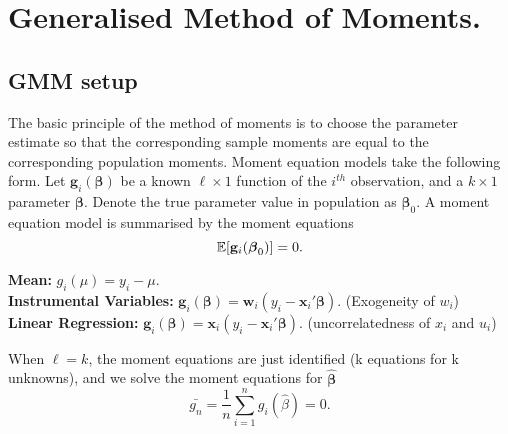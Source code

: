 \documentclass[DIV=14,titlepage=false]{scrreprt}
\begin{document}
\vspace{-10pt}
\setcounter{chapter}{15}
\chapter{Generalised Method of Moments.}
\section{GMM setup}
The basic principle of the method of moments is to choose the parameter estimate so that the corresponding sample moments are equal to the corresponding population moments. Moment equation models take the following form. Let $\mathbf{g}_i(\boldsymbol{\beta})$ be a known $\ell \times1$ function of the $i^{th}$ observation, and a $k\times1$ parameter $\boldsymbol{\beta}$. Denote the true parameter value in population as $\boldsymbol{\beta}_0$. A moment equation model is summarised by the moment equations \[\mathbb{E}[\mathbf{g}_i(\boldsymbol{\beta}_0)]=0.\]
\begin{example}
    \textbf{Mean:} $g_i(\mu)=y_i-\mu$. \\
    \textbf{Instrumental Variables:} $\mathbf{g}_i(\boldsymbol{\beta})=\mathbf{w}_i({y}_i-\mathbf{x}_i'\boldsymbol{\beta})$. (Exogeneity of $w_i$) \\
    \textbf{Linear Regression:} $\mathbf{g}_i(\boldsymbol{\beta})=\mathbf{x}_i({y}_i-\mathbf{x}_i'\boldsymbol{\beta})$. (uncorrelatedness of $x_i$ and $u_i$) 
\end{example}

When $\ell=k$, the moment equations are just identified (k equations for k unknowns), and we solve the moment equations for $\boldsymbol{\hat\beta}$ \[\bar{g_n}=\frac{1}{n}\sum_{i=1}^{n}g_i(\hat \beta)=0.\]
\end{document}
